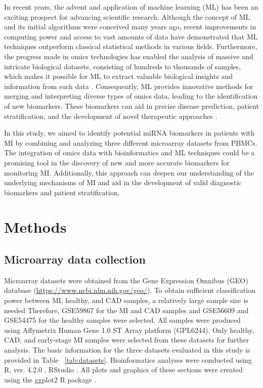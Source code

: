 \documentclass[sn-mathphys,Numbered]{sn-jnl}%
\theoremstyle{thmstyleone}%
\theoremstyle{thmstyletwo}%
\theoremstyle{thmstylethree}%
\begin{document}
In recent years, the advent and application of machine learning (ML) has
been an exciting prospect for advancing scientific research. Although
the concept of ML and its initial algorithms were conceived many years
ago, recent improvements in computing power and access to vast amounts
of data have demonstrated that ML techniques outperform classical
statistical methods in various fields. Furthermore, the progress made in
omics technologies has enabled the analysis of massive and intricate
biological datasets, consisting of hundreds to thousands of samples,
which makes it possible for ML to extract valuable biological insights
and information from such data \cite{ML-Bio}. Consequently, ML
provides innovative methods for merging and interpreting diverse types
of omics data, leading to the identification of new biomarkers. These
biomarkers can aid in precise disease prediction, patient
stratification, and the development of novel therapeutic approaches
\cite{ML}.

In this study, we aimed to identify potential miRNA biomarkers in
patients with MI by combining and analyzing three different microarray
datasets from PBMCs. The integration of omics data with bioinformatics
and ML techniques could be a promising tool in the discovery of new and
more accurate biomarkers for monitoring MI. Additionally, this approach
can deepen our understanding of the underlying mechanisms of MI and aid
in the development of valid diagnostic biomarkers and patient
stratification.
 
\section{Methods}\label{methods}

\subsection{Microarray data
collection}\label{microarray-data-collection}

Microarray datasets were obtained from the Gene Expression Omnibus (GEO)
database (\url{https://www.ncbi.nlm.nih.gov/geo/}). To obtain sufficient
classification power between MI, healthy, and CAD samples, a relatively
large sample size is needed Therefore, GSE59867 for the MI and CAD
samples and GSE56609 and GSE54475 for the healthy samples were selected.
All samples were produced using Affymetrix Human Gene 1.0 ST Array
platform (GPL6244). Only healthy, CAD, and early-stage MI samples were
selected from these datasets for further analysis. The basic information
for the three datasets evaluated in this study is provided in Table
~\ref{tab:datasets}. Bioinformatics analyses were conducted using R, ver.
4.2.0 \cite{R}, RStudio \cite{RStudio}. All plots and
graphics of these sections were created using the ggplot2 R package \cite{ggplot}.
\end{document}
